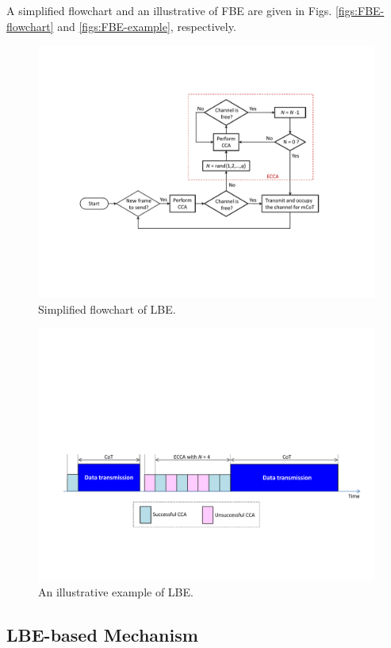 A simplified flowchart and an illustrative of FBE are given in Figs. \ref{figs:FBE-flowchart} and \ref{figs:FBE-example}, respectively.


\begin{figure}[!t]
	\centering
	\includegraphics[width=0.9\columnwidth]{figures2/LBE-flowchart}
	\caption{Simplified flowchart of LBE.}
	\label{figs:LBE-flowchart}
\end{figure}

\begin{figure}[!t]
	\centering
	\includegraphics[width=0.9\columnwidth]{figures2/LBE-example}
	\caption{An illustrative example of LBE.}
	\label{figs:LBE-example}
\end{figure}


\subsection{LBE-based Mechanism}
\label{etsi-lbt:lbe}

